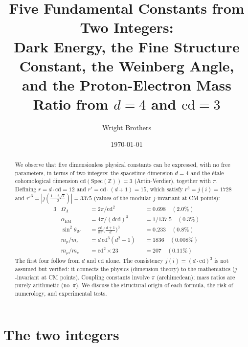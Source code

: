\documentclass[aps,prl,twocolumn,superscriptaddress,nofootinbib]{revtex4-2}
\newcommand{\Spec}{\mathrm{Spec}}
\newcommand{\cd}{\mathrm{cd}}
\newcommand{\Z}{\mathbb{Z}}
\begin{document}
\title{Five Fundamental Constants from Two Integers:\\
Dark Energy, the Fine Structure Constant, the Weinberg Angle,\\
and the Proton-Electron Mass Ratio from $d=4$ and $\cd=3$}

\author{Wright Brothers}
\date{\today}

\begin{abstract}
We observe that five dimensionless physical constants can be expressed,
with no free parameters, in terms of two integers:
the spacetime dimension $d = 4$ and the \'etale cohomological dimension
$\cd(\Spec(\Z)) = 3$ (Artin-Verdier), together with $\pi$.
Defining $r = d \cdot \cd = 12$ and $r' = \cd \cdot (d+1) = 15$,
which satisfy $r^3 = j(i) = 1728$ and ${r'}^3 = |j(\tfrac{1+i\sqrt{7}}{2})| = 3375$
(values of the modular $j$-invariant at CM points):
\begin{alignat*}{3}
  &\Omega_\Lambda &&= 2\pi/\cd^2 &&= 0.698 \quad (2.0\%) \\
  &\alpha_{\mathrm{EM}} &&= 4\pi/(d\cd)^3 &&= 1/137.5 \quad (0.3\%) \\
  &\sin^2\theta_W &&= \tfrac{\cd}{8\pi}\bigl(\tfrac{d+1}{d}\bigr)^{\!3}
    &&= 0.233 \quad (0.8\%) \\
  &m_p/m_e &&= d\,\cd^3(d^2+1) &&= 1836 \quad (0.008\%) \\
  &m_\mu/m_e &&= \cd^2 \times 23 &&= 207 \quad (0.11\%)
\end{alignat*}
The first four follow from $d$ and $\cd$ alone.
The consistency $j(i) = (d \cdot \cd)^3$ is not assumed but verified:
it connects the physics (dimension theory) to the mathematics
($j$-invariant at CM points).
Coupling constants involve $\pi$ (archimedean);
mass ratios are purely arithmetic (no~$\pi$).
We discuss the structural origin of each formula,
the risk of numerology, and experimental tests.
\end{abstract}

\maketitle

\section{The two integers}
\end{document}
